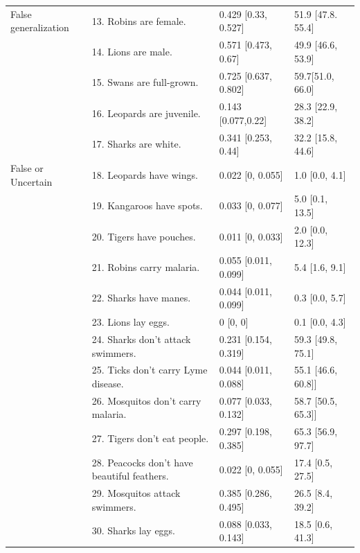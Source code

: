 \documentclass[10pt,letterpaper]{article}
\begin{document}
\begin{table}[h]
\begin{tabular}{| l | l | p{3.5cm} | p{3.5cm} |}
False generalization & 13. Robins are female.      &0.429	[0.33, 0.527] & 51.9 [47.8. 55.4]\\
                                              & 14.  Lions are male.                       &0.571	[0.473, 0.67] & 49.9 [46.6, 53.9]\\
                                         & 15. Swans are full-grown. & 0.725	[0.637, 0.802] & 59.7[51.0, 66.0]\\
                                         & 16. Leopards are juvenile. & 0.143	[0.077,0.22] & 28.3 [22.9, 38.2] \\
                                         & 17. Sharks are white. & 0.341	[0.253, 0.44] & 32.2 [15.8, 44.6] \\
False or Uncertain & 18. Leopards have wings.       &0.022	[0, 0.055]& 1.0 [0.0, 4.1]\\
                                              & 19. Kangaroos have spots.                       & 0.033 [0, 0.077]& 5.0 [0.1, 13.5]\\
                                              & 20.  Tigers have pouches.                       &0.011	[0, 0.033]& 2.0 [0.0, 12.3]\\
                                              & 21.  Robins carry malaria.                       &0.055	[0.011, 0.099]& 5.4 [1.6, 9.1]\\
                                              & 22. Sharks have manes.                       &0.044	[0.011, 0.099]& 0.3 [0.0, 5.7]\\
                                              & 23. Lions lay eggs.                       &0 [0, 0] & 0.1 [0.0, 4.3]\\
                                              & 24. Sharks don't attack swimmers.                       &0.231 [0.154, 0.319] & 59.3 [49.8, 75.1]\\
                                              & 25. Ticks don't carry Lyme disease.                       &0.044 [0.011, 0.088] & 55.1 [46.6, 60.8]]\\
                                              & 26. Mosquitos don't carry malaria.                       &0.077 [0.033, 0.132] & 58.7 [50.5, 65.3]]\\                                              
                                              & 27. Tigers don't eat people.                       &0.297 [0.198, 0.385]& 65.3 [56.9, 97.7]\\                                              
                                              & 28. Peacocks don't have beautiful feathers.                       &0.022 [0, 0.055] & 17.4 [0.5, 27.5]\\                                              
                                               & 29. Mosquitos attack swimmers.       &0.385 [0.286, 0.495] & 26.5 [8.4, 39.2]\\
			                         & 30. Sharks lay eggs.       &0.088 [0.033, 0.143] & 18.5 [0.6, 41.3]\\
\hline


\end{tabular}
\end{table}
\end{document}
